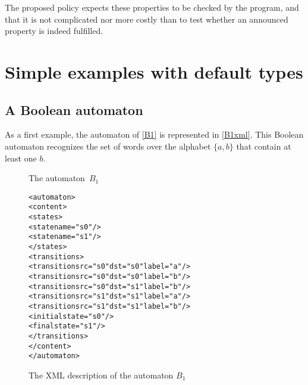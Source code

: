 \documentclass[a4paper]{article}
\newcommand{\medskipneg}{\vspace*{-2ex}} %
\newcommand{\xattr}[1]{\texttt{#1}}
\def\dstname{\xattr{dst}}
\def\srcname{\xattr{src}}
\begin{document}
The proposed policy expects these properties to be checked by the
program, and that it is not complicated nor more costly than to test
whether an announced property is indeed fulfilled.

\section{Simple examples with default types}
\subsection{A Boolean automaton}

As a first example, the automaton of \autoref{B1} is represented in
\autoref{B1xml}. This Boolean automaton recognizes the set of words
over the alphabet $\{a,b\}$ that contain at least one $b$.

\begin{figure}[ht]
\begin{center}
\end{center}
\vspace*{-.8cm}
\caption{The automaton~$B_1$}\label{B1}
\medskipneg
\end{figure}

\begin{figure}[ht]
  \small
  \begin{center}
\begin{alltt}
<automaton>
  <content>
    <states>
       <state name="s0"/>
       <state name="s1"/>
    </states>
    <transitions>
       <transition \srcname{}="s0" \dstname{}="s0" label="a"/>
       <transition \srcname{}="s0" \dstname{}="s0" label="b"/>
       <transition \srcname{}="s0" \dstname{}="s1" label="b"/>
       <transition \srcname{}="s1" \dstname{}="s1" label="a"/>
       <transition \srcname{}="s1" \dstname{}="s1" label="b"/>
       <initial state="s0"/>
       <final state="s1"/>
    </transitions>
  </content>
</automaton>
\end{alltt}

\caption{The XML description of the automaton $B_1$}
\label{B1xml}
  \end{center}
\end{figure}
\end{document}
